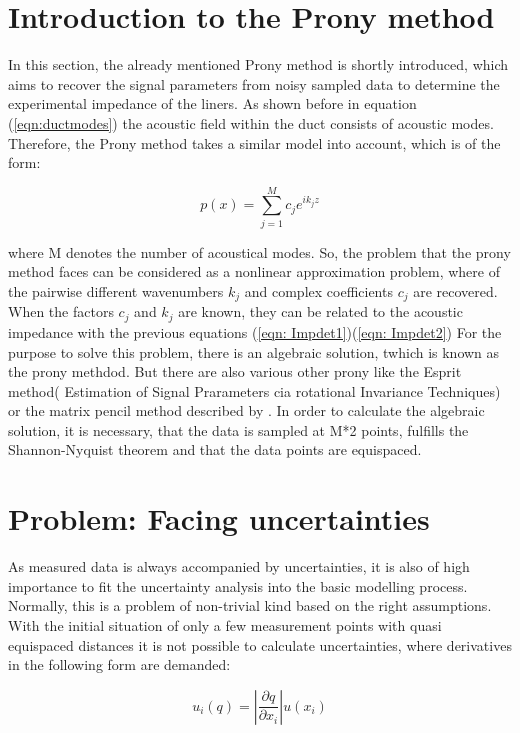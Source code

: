 \documentclass[11pt]{report} %
\begin{document}
\section{Introduction to the Prony method}
In this section, the already mentioned Prony method is shortly introduced, which aims to recover the signal parameters from noisy sampled data to determine the experimental impedance of the liners.
As shown before in equation (\eqref{eqn:ductmodes}) the acoustic field within the duct consists of acoustic modes. 
Therefore, the Prony method takes a similar model into account, which is of the form: 

\begin{equation}\label{eqn: expsum}
 p(x)=\sum\limits_{j=1}^M c_{j}e^{ik_{j}z} 
\end{equation}

where M denotes the number of acoustical modes. 
So, the problem that the prony method faces  can be considered as a nonlinear approximation problem, where of the  pairwise different wavenumbers $k_{j}$ and complex coefficients $c_{j}$ are recovered.
When the factors $c_j$ and $k_j$ are known, they can be related to the acoustic impedance with the previous equations (\ref{eqn: Impdet1})(\ref{eqn: Impdet2})
For the purpose to solve this problem, there is an algebraic solution, twhich is known as the prony methdod. But there are also various other prony like the Esprit method( Estimation of Signal Prarameters cia rotational Invariance Techniques) or the matrix pencil method described by \cite{Potts}.
In order to calculate the algebraic solution, it is necessary, that the data is sampled at M*2 points, fulfills the Shannon-Nyquist theorem and that the data points are equispaced. 

\section{Problem: Facing uncertainties}
As measured data is always accompanied by uncertainties, it is also of high importance to fit the uncertainty analysis into the basic modelling process.
Normally, this is a problem of non-trivial kind based on the right assumptions.
With the initial situation of only a few measurement points with quasi equispaced distances it is not possible to calculate uncertainties, where derivatives in the following form are demanded:

\begin{equation}
u_{i}(q)= \left\vert \frac{\partial q}{\partial x_{i}} \right\vert u( x_{i})
\end{equation}
\end{document}
